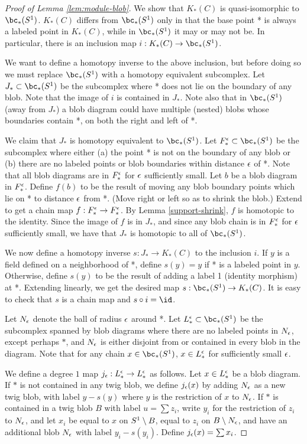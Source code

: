 \begin{proof}[Proof of Lemma \ref{lem:module-blob}]
We show that $K_*(C)$ is quasi-isomorphic to $\bc_*(S^1)$.
$K_*(C)$ differs from $\bc_*(S^1)$ only in that the base point *
is always a labeled point in $K_*(C)$, while in $\bc_*(S^1)$ it may or may not be.
In particular, there is an inclusion map $i: K_*(C) \to \bc_*(S^1)$.

We want to define a homotopy inverse to the above inclusion, but before doing so
we must replace $\bc_*(S^1)$ with a homotopy equivalent subcomplex.
Let $J_* \sub \bc_*(S^1)$ be the subcomplex where * does not lie on the boundary
of any blob.  Note that the image of $i$ is contained in $J_*$.
Note also that in $\bc_*(S^1)$ (away from $J_*$) 
a blob diagram could have multiple (nested) blobs whose
boundaries contain *, on both the right and left of *.

We claim that $J_*$ is homotopy equivalent to $\bc_*(S^1)$.
Let $F_*^\ep \sub \bc_*(S^1)$ be the subcomplex where either
(a) the point * is not on the boundary of any blob or
(b) there are no labeled points or blob boundaries within distance $\epsilon$ of *.
Note that all blob diagrams are in $F_*^\epsilon$ for $\epsilon$ sufficiently small.
Let $b$ be a blob diagram in $F_*^\epsilon$.
Define $f(b)$ to be the result of moving any blob boundary points which lie on *
to distance $\epsilon$ from *.
(Move right or left so as to shrink the blob.)
Extend to get a chain map $f: F_*^\epsilon \to F_*^\epsilon$.
By Lemma \ref{support-shrink}, $f$ is homotopic to the identity.
Since the image of $f$ is in $J_*$, and since any blob chain is in $F_*^\epsilon$
for $\epsilon$ sufficiently small, we have that $J_*$ is homotopic to all of $\bc_*(S^1)$.

We now define a homotopy inverse $s: J_* \to K_*(C)$ to the inclusion $i$.
If $y$ is a field defined on a neighborhood of *, define $s(y) = y$ if
* is a labeled point in $y$.
Otherwise, define $s(y)$ to be the result of adding a label 1 (identity morphism) at *.
Extending linearly, we get the desired map $s: \bc_*(S^1) \to K_*(C)$.
It is easy to check that $s$ is a chain map and $s \circ i = \id$.

Let $N_\epsilon$ denote the ball of radius $\epsilon$ around *.
Let $L_*^\ep \sub \bc_*(S^1)$ be the subcomplex 
spanned by blob diagrams
where there are no labeled points
in $N_\epsilon$, except perhaps $*$, and $N_\epsilon$ is either disjoint from or contained in 
every blob in the diagram.
Note that for any chain $x \in \bc_*(S^1)$, $x \in L_*^\epsilon$ for sufficiently small $\epsilon$.

We define a degree $1$ map $j_\epsilon: L_*^\epsilon \to L_*^\epsilon$ as follows. Let $x \in L_*^\epsilon$ be a blob diagram.
If $*$ is not contained in any twig blob, we define $j_\epsilon(x)$ by adding $N_\epsilon$ as a new twig blob, with label $y - s(y)$ where $y$ is the restriction
of $x$ to $N_\epsilon$. If $*$ is contained in a twig blob $B$ with label $u=\sum z_i$,
write $y_i$ for the restriction of $z_i$ to $N_\epsilon$, and let
$x_i$ be equal to $x$ on $S^1 \setminus B$, equal to $z_i$ on $B \setminus N_\epsilon$,
and have an additional blob $N_\epsilon$ with label $y_i - s(y_i)$.
Define $j_\epsilon(x) = \sum x_i$.


\end{proof}
